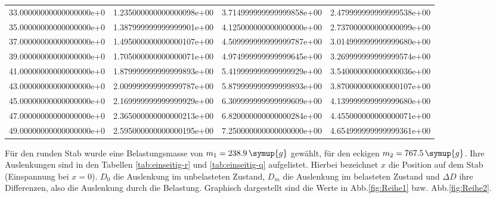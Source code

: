 \begin{table}
\begin{tabular}{S S S S}
    33.00000000000000000e+0 & 1.235000000000000098e+00 & 3.714999999999999858e+00 & 2.479999999999999538e+00\\
    35.00000000000000000e+0 & 1.387999999999999901e+00 & 4.125000000000000000e+00 & 2.737000000000000099e+00\\
    37.00000000000000000e+0 & 1.495000000000000107e+00 & 4.509999999999999787e+00 & 3.014999999999999680e+00\\
    39.00000000000000000e+0 & 1.705000000000000071e+00 & 4.974999999999999645e+00 & 3.269999999999999574e+00\\
    41.00000000000000000e+0 & 1.879999999999999893e+00 & 5.419999999999999929e+00 & 3.540000000000000036e+00\\
    43.00000000000000000e+0 & 2.009999999999999787e+00 & 5.879999999999999893e+00 & 3.870000000000000107e+00\\
    45.00000000000000000e+0 & 2.169999999999999929e+00 & 6.309999999999999609e+00 & 4.139999999999999680e+00\\
    47.00000000000000000e+0 & 2.365000000000000213e+00 & 6.820000000000000284e+00 & 4.455000000000000071e+00\\
    49.00000000000000000e+0 & 2.595000000000000195e+00 & 7.250000000000000000e+00 & 4.654999999999999361e+00\\
    \bottomrule
  \end{tabular}
\end{table}
\FloatBarrier

Für den runden Stab wurde eine Belastungsmasse von $m_1 = 238.9 \, \symup{g}$ gewählt, für den eckigen $m_2 = 767.5\, \symup{g}$. Ihre Auslenkungen sind in den Tabellen \ref{tab:einseitig-r} und \ref{tab:einseitig-q} aufgelistet. Hierbei bezeichnet $x$ die Position auf dem Stab (Einspannung bei $x = 0$). $D_0$ die Auslenkung im unbelasteten Zustand, $ D_m$ die Auslenkung im belasteten Zustand und $\Delta D$ ihre Differenzen, also die Auslenkung durch die Belastung. Graphisch dargestellt sind die Werte in Abb.\ref{fig:Reihe1} bzw. Abb.\ref{fig:Reihe2}.

